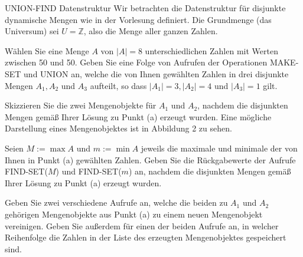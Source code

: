 \documentclass{article}
\begin{document}
\begin{eexercises}{UNION-FIND Datenstruktur}{
    Wir betrachten die Datenstruktur für disjunkte dynamische Mengen wie in der Vorlesung definiert. Die Grundmenge (das Universum) sei $U = \mathbb{Z}$, also die Menge aller ganzen Zahlen.
  }
  \item Wählen Sie eine Menge $A$ von $|A| = 8$ unterschiedlichen Zahlen mit Werten zwischen 50 und 50. Geben Sie eine Folge von Aufrufen der Operationen MAKE-SET und UNION an, welche die von Ihnen gewählten Zahlen in drei disjunkte Mengen $A_1, A_2$ und $A_3$ aufteilt, so dass $|A_1| = 3, |A_2| = 4$ und $|A_3| = 1$ gilt.
  \item Skizzieren Sie die zwei Mengenobjekte für $A_1$ und $A_2$, nachdem die disjunkten Mengen gemäß Ihrer Lösung zu Punkt (a) erzeugt wurden. Eine mögliche Darstellung eines Mengenobjektes ist in Abbildung 2 zu sehen.
  \item Seien $M := \max A$ und $m := \min A$ jeweils die maximale und minimale der von Ihnen in Punkt (a) gewählten Zahlen. Geben Sie die Rückgabewerte der Aufrufe FIND-SET($M$) und FIND-SET($m$) an, nachdem die disjunkten Mengen gemäß Ihrer Lösung zu Punkt (a) erzeugt wurden.
  \item Geben Sie zwei verschiedene Aufrufe an, welche die beiden zu $A_1$ und $A_2$ gehörigen Mengenobjekte aus Punkt (a) zu einem neuen Mengenobjekt vereinigen. Geben Sie außerdem für einen der beiden Aufrufe an, in welcher Reihenfolge die Zahlen in der Liste des erzeugten Mengenobjektes gespeichert sind.
\end{eexercises}
\end{document}
